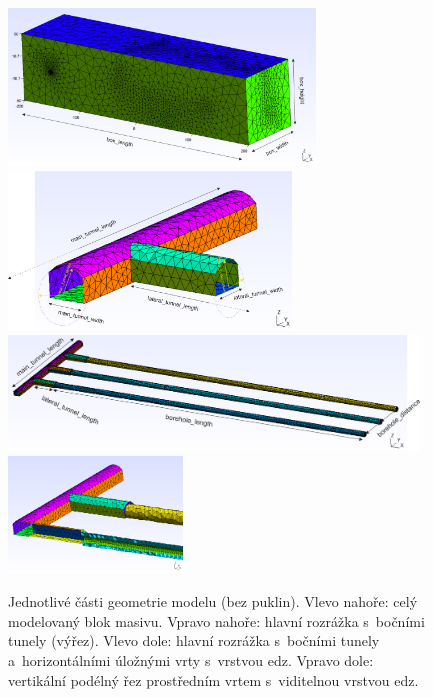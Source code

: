 \documentclass[11pt,a4paper]{article}
\begin{document}
\begin{onehalfspacing}
\begin{figure}[ht]
\centering
\includegraphics[height=4.2cm]{graphics/obr_ralek/box_okotovany.png}
\includegraphics[height=4.2cm]{graphics/obr_ralek/main_tunnel_rez_okotovany.png}
\\
\includegraphics[height=3.1cm]{graphics/obr_ralek/boreholes_okotovane.png}
\includegraphics[height=3.1cm]{graphics/obr_ralek/rez_podel.PNG}
\caption{Jednotlivé části geometrie modelu (bez puklin). Vlevo nahoře: celý modelovaný blok masivu. Vpravo nahoře: hlavní rozrážka s~bočními tunely (výřez). Vlevo dole: hlavní rozrážka s~bočními tunely a~horizontálními úložnými vrty s~vrstvou edz. Vpravo dole: vertikální podélný řez prostředním vrtem s~viditelnou vrstvou edz.}
\label{geom_okotovana}
\end{figure}
\vspace{-0.5cm}


\end{onehalfspacing}
\end{document}
